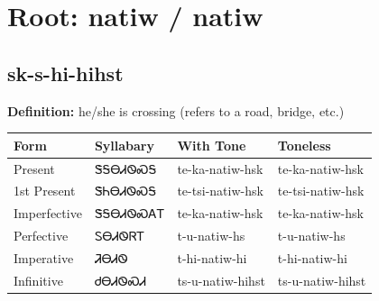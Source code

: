\documentclass{article}%
\begin{document}
%
\normalsize%
\section*{Root: natiw / natiw}%
\subsection*{sk-s-hi-hihst}%
\textbf{Definition: }%
he/she is crossing (refers to a road‚ bridge‚ etc.)%
\\[0.5em]%
\begin{tabular}{|l|l|l|l|}%
\hline%
\textbf{Form}&\textbf{Syllabary}&\textbf{With Tone}&\textbf{Toneless}\\%
\hline%
Present&ᏕᎦᎾᏗᏫᏍᎦ&te{-}ka{-}natiw{-}hsk&te{-}ka{-}natiw{-}hsk\\%
1st Present&ᏕᏂᎾᏗᏫᏍᎦ&te{-}tsi{-}natiw{-}hsk&te{-}tsi{-}natiw{-}hsk\\%
Imperfective&ᏕᎦᎾᏗᏫᏍᎪᎢ&te{-}ka{-}natiw{-}hsk&te{-}ka{-}natiw{-}hsk\\%
Perfective&ᏚᎾᏗᏫᏒᎢ&t{-}u{-}natiw{-}hs&t{-}u{-}natiw{-}hs\\%
Imperative&ᏘᎾᏗᏫ&t{-}hi{-}natiw{-}hi&t{-}hi{-}natiw{-}hi\\%
Infinitive&ᏧᎾᏗᏫᏍᏗ&ts{-}u{-}natiw{-}hihst&ts{-}u{-}natiw{-}hihst\\%
\hline%
\end{tabular}%
\\[1em]%
\end{document}

